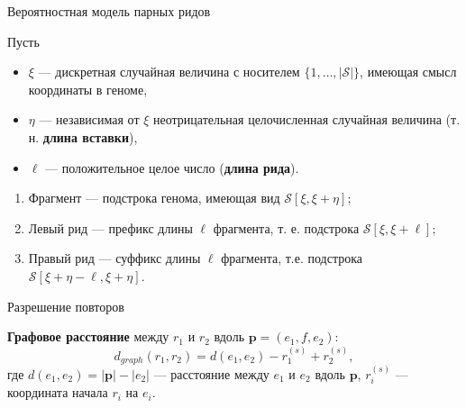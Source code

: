 \documentclass[unicode, notheorems]{beamer}
\begin{document}
\begin{frame}{Вероятностная модель парных ридов}
	
	Пусть
	\begin{itemize}
		\item  $\xi$ --- дискретная случайная величина с носителем $\{ 1, \ldots, |\mathcal{S}|\}$, имеющая смысл координаты в геноме,
		\item $\eta$ --- независимая от $\xi$ неотрицательная целочисленная случайная величина (т. н. \textbf{длина вставки}),
		\item $\ell$ --- положительное целое число (\textbf{длина рида}).
	\end{itemize}
	\begin{block}{}
			\begin{enumerate}
				\item Фрагмент --- подстрока генома, имеющая вид $\mathcal{S}[\xi, \xi+\eta]$;
				\item Левый рид --- префикс длины $\ell$ фрагмента, т. е. подстрока  $\mathcal{S}[\xi, \xi+\ell]$;
				\item Правый рид --- суффикс длины $\ell$ фрагмента, т.е. подстрока $\mathcal{S}[\xi+\eta-\ell, \xi+\eta]$.
			\end{enumerate}
	\end{block}
\end{frame}

\begin{frame}{Разрешение повторов}
	\begin{figure}	
		\centering
	\end{figure} 

	\textbf{Графовое расстояние} между $r_1$ и $r_2$ вдоль $\mathbf{p} = (e_1, f, e_2)$: 
	\begin{equation*}
		d_{graph}(r_1, r_2) = d(e_1, e_2) - r_1^{(s)} + r_2^{(s)},
	\end{equation*}
	где $d(e_1, e_2) = |\mathbf{p}| - |e_2|$ --- расстояние между $e_1$ и $e_2$ вдоль $\mathbf{p}$, $r_i^{(s)}$ --- координата начала $r_i$ на $e_i$.
\end{frame}
\end{document}
